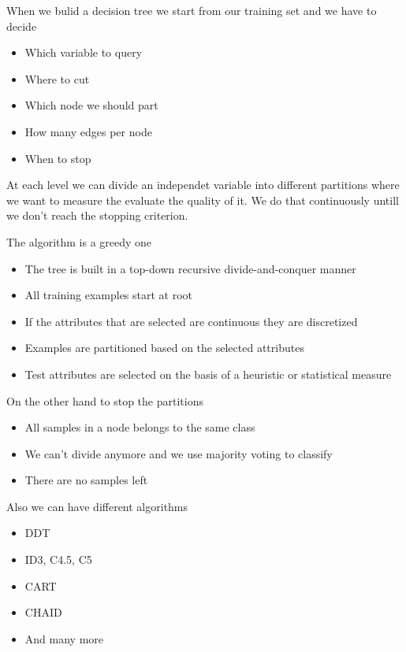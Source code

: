 When we bulid a decision tree we start from our training set and we have to decide 

\begin{itemize}
    \item Which variable to query 
    \item Where to cut
    \item Which node we should part
    \item How many edges per node
    \item When to stop
\end{itemize}

At each level we can divide an independet variable into different partitions where we want to measure the evaluate the quality of it. We do that continuously untill we don't reach the stopping criterion. 

\vspace{10pt}

The algorithm is a greedy one

\begin{itemize}
    \item The tree is built in a top-down recursive divide-and-conquer manner
    \item All training examples start at root
    \item If the attributes that are selected are continuous they are discretized
    \item Examples are partitioned based on the selected attributes
    \item Test attributes are selected on the basis of a heuristic or statistical measure
\end{itemize}

On the other hand to stop the partitions

\begin{itemize}
    \item All samples in a node belongs to the same class
    \item We can't divide anymore and we use majority voting to classify
    \item There are no samples left
\end{itemize}

Also we can have different algorithms

\begin{itemize}
    \item DDT 
    \item ID3, C4.5, C5
    \item CART
    \item CHAID
    \item And many more
\end{itemize}

